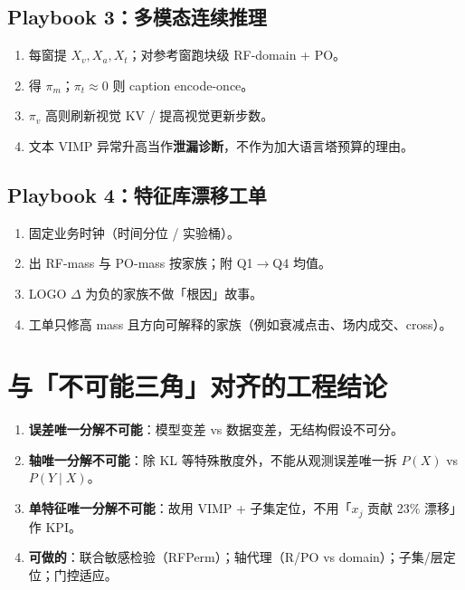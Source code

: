 \documentclass[11pt,a4paper,UTF8,fontset=none]{ctexart}
\begin{document}
\subsection{Playbook 3：多模态连续推理}
\begin{enumerate}
  \item 每窗提 \(X_v,X_a,X_t\)；对参考窗跑块级 RF-domain + PO。
  \item 得 \(\pi_m\)；\(\pi_t\approx 0\) 则 caption encode-once。
  \item \(\pi_v\) 高则刷新视觉 KV / 提高视觉更新步数。
  \item 文本 VIMP 异常升高当作\textbf{泄漏诊断}，不作为加大语言塔预算的理由。
\end{enumerate}

\subsection{Playbook 4：特征库漂移工单}
\begin{enumerate}
  \item 固定业务时钟（时间分位 / 实验桶）。
  \item 出 RF-mass 与 PO-mass 按家族；附 Q1\(\to\)Q4 均值。
  \item LOGO \(\Delta\) 为负的家族不做「根因」故事。
  \item 工单只修高 mass 且方向可解释的家族（例如衰减点击、场内成交、cross）。
\end{enumerate}

\section{与「不可能三角」对齐的工程结论}
\label{sec:impossibility}

\begin{enumerate}
  \item \textbf{误差唯一分解不可能}：模型变差 vs 数据变差，无结构假设不可分。
  \item \textbf{轴唯一分解不可能}：除 KL 等特殊散度外，不能从观测误差唯一拆 \(P(X)\) vs \(P(Y\mid X)\)。
  \item \textbf{单特征唯一分解不可能}：故用 VIMP + 子集定位，不用「\(x_j\) 贡献 23\% 漂移」作 KPI。
  \item \textbf{可做的}：联合敏感检验（RFPerm）；轴代理（R/PO vs domain）；子集/层定位；门控适应。
\end{enumerate}

\end{document}
